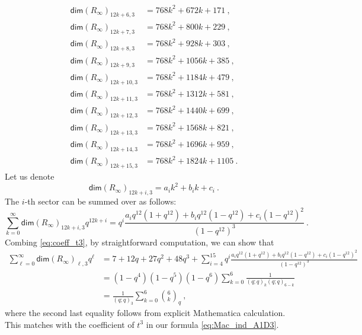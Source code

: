 \documentclass[a4paper,10pt]{article}
\newcommand{\mr}[1]{\mathsf{#1}}
\begin{document}
\begin{appendix}
\begin{equation}
\begin{aligned}
\mr{dim}(R_\infty)_{12k+6,3} & =768 k^2+672 k+171~, \\
\mr{dim}(R_\infty)_{12k+7,3} & =768 k^2+800 k+229~, \\
\mr{dim}(R_\infty)_{12k+8,3} & =768 k^2+928 k+303~, \\
\mr{dim}(R_\infty)_{12k+9,3} & =768 k^2+1056 k+385~, \\
\mr{dim}(R_\infty)_{12k+10,3} & =768 k^2+1184 k+479~, \\
\mr{dim}(R_\infty)_{12k+11,3} & =768 k^2+1312 k+581~, \\
\mr{dim}(R_\infty)_{12k+12,3}& =768 k^2+1440 k+699~, \\
\mr{dim}(R_\infty)_{12k+13,3} & =768 k^2+1568 k+821~, \\
\mr{dim}(R_\infty)_{12k+14,3} & =768 k^2+1696 k+959~, \\
\mr{dim}(R_\infty)_{12k+15,3} & =768 k^2+1824 k+1105~.
\end{aligned}
\end{equation}
Let us denote
\begin{equation}
\mr{dim}(R_\infty)_{12k+i,3}=a_i k^2+b_i k+c_i~.
\end{equation}
The $i$-th sector can be summed over as follows:
\begin{equation}
\sum_{k=0}^{\infty} \mr{dim}(R_\infty)_{12k+i,3} q^{12 k+i}=q^i \frac{a_i q^{12}\left(1+q^{12}\right)+b_i q^{12}\left(1-q^{12}\right)+c_i\left(1-q^{12}\right)^2}{\left(1-q^{12}\right)^3}~.
\end{equation}
Combing \eqref{eq:coeff_t3}, by straightforward computation, we can show that
\begin{equation}\label{eq:I-3_ser}
\begin{aligned}
\sum_{\ell=0}^\infty \mr{dim}(R_\infty)_{\ell,3} q^\ell&= 7+12 q+27 q^2+48 q^3+\sum_{i=4}^{15} q^i \frac{a_i q^{12}\left(1+q^{12}\right)+b_i q^{12}\left(1-q^{12}\right)+c_i\left(1-q^{12}\right)^2}{\left(1-q^{12}\right)^3} \\
& =\left(1-q^4\right)\left(1-q^5\right)\left(1-q^6\right) \sum_{k=0}^6 \frac{1}{(q ; q)_k(q ; q)_{6-k}}
\\
&=\frac{1}{(q;q)_3} \sum_{k=0}^{6}\binom{6}{k}_q~,
\end{aligned}
\end{equation}
where the second last equality follows from explicit Mathematica calculation. 
This matches with the coefficient of $t^3$ in our formula \eqref{eq:Mac_ind_A1D3}.

\end{appendix}
\end{document}
